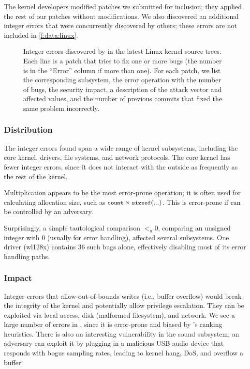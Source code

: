 The kernel developers modified \nrpatchesmod patches we submitted
for inclusion; they applied the rest of our patches without
modifications.
%
We also discovered an additional \nrbugsbyothers integer errors that
were concurrently discovered by others; these errors are not included
in \autoref{f:data:linux}.

\begin{figure*}
\centering
\footnotesize

\caption{Integer errors discovered by \sys in the latest Linux
kernel source trees.  Each line is a patch that tries to fix one
or more bugs (the number is in the ``Error'' column if more than
one).  For each patch, we list the corresponding subsystem, the
error operation with the number of bugs, the security impact, a
description of the attack vector and affected values, and the number
of previous commits that fixed the same problem incorrectly.}
\label{f:data:linux}
\end{figure*}

\subsubsection{Distribution}

The integer errors \sys found span a wide range of kernel subsystems,
including the core kernel, drivers, file systems, and network protocols.
The core kernel has fewer integer errors, since it does not
interact with the outside as frequently as the rest of the kernel.

Multiplication appears to be the most error-prone operation; it is
often used for calculating allocation size, such as $\cc{count}
\times \cc{sizeof}(...)$.  This is error-prone if  can
be controlled by an adversary.

Surprisingly,  a simple tautological comparison $<_u 0$,
comparing an unsigned integer with 0 (usually for error handling),
affected several subsystems.
One driver (wl128x) contains 36 such bugs alone, effectively
disabling most of its error handling paths.

\subsubsection{Impact}

Integer errors that allow out-of-bounds writes (i.e., buffer
overflow) would break the integrity of the kernel and potentially
allow privilege escalation.  They can be exploited via local access,
disk (malformed filesystem), and network.  We see a large number of
errors in , since it is error-prone and biased by \sys's
ranking heuristics.
%
There is also an interesting vulnerability in the sound subsystem;
an adversary can exploit it by plugging in a malicious USB audio
device that responds with bogus sampling rates, leading to kernel
hang, DoS, and overflow a buffer.

